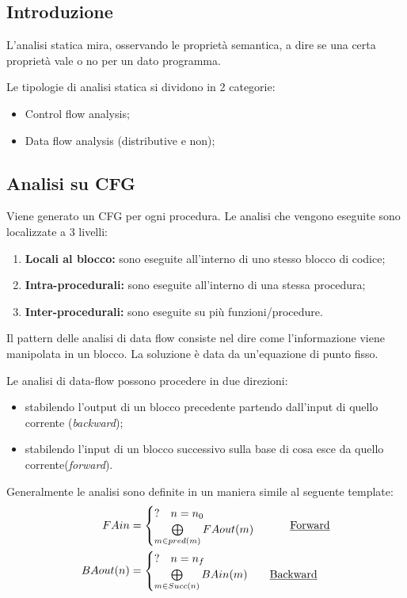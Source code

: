 \documentclass[a4paper, 10pt]{article}
\begin{document}
	\subsection{Introduzione}
	L'analisi statica mira, osservando le proprietà semantica, a dire se una certa proprietà vale o no per un dato programma.
	
	Le tipologie di analisi statica si dividono in 2 categorie: \begin{itemize}
		\item Control flow analysis;
		\item Data flow analysis (distributive e non);
	\end{itemize}

	\subsection{Analisi su CFG}
	Viene generato un CFG per ogni procedura. Le analisi che vengono eseguite sono localizzate a 3 livelli: \begin{enumerate}
		\item \textbf{Locali al blocco:} sono eseguite all'interno di uno stesso blocco di codice;
		\item \textbf{Intra-procedurali:} sono eseguite all'interno di una stessa procedura;
		\item \textbf{Inter-procedurali:} sono eseguite su più funzioni/procedure.
	\end{enumerate}

	Il pattern delle analisi di data flow consiste nel dire come l'informazione viene manipolata in un blocco. La soluzione è data da un'equazione di punto fisso.
	
	Le analisi di data-flow possono procedere in due direzioni: \begin{itemize}
		\item stabilendo l'output di un blocco precedente partendo dall'input di quello corrente (\textit{backward});
		\item stabilendo l'input di un blocco successivo sulla base di cosa esce da quello corrente(\textit{forward}).
	\end{itemize}
	
	Generalmente le analisi sono definite in un maniera simile al seguente template: \begin{align*}
		FAin &= \begin{cases}
		? \quad n=n_0 \\
		\bigoplus\limits_{m \in pred(m)} FAout(m)
		\end{cases} \qquad \text{\underline{Forward}} \\
		BAout(n) &= \begin{cases}
		? \quad n=n_f \\
		\bigoplus\limits_{m \in Succ(n)} BAin(m) \qquad \text{\underline{Backward}}
		\end{cases}
		\end{align*}
		
\end{document}
